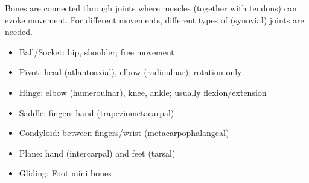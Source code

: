 Bones are connected through joints where muscles (together with tendons) can evoke movement.
For different movements, different types of (synovial) joints are needed.

\begin{itemize}
    \setlength\itemsep{0em}
    \item Ball/Socket: hip, shoulder; free movement
    \item Pivot: head (atlantoaxial), elbow (radioulnar); rotation only
    \item Hinge: elbow (humeroulnar), knee, ankle; usually flexion/extension
    \item Saddle: fingers-hand (trapeziometacarpal)
    \item Condyloid: between fingers/wrist (metacarpophalangeal)
    \item Plane: hand (intercarpal) and feet (tarsal)
    \item Gliding: Foot mini bones
\end{itemize}
